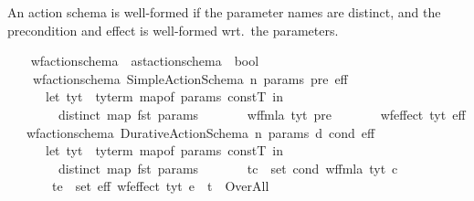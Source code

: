 \begin{isabellebody}
\begin{isamarkuptext}%
An action schema is well-formed if the parameter names are distinct,
    and the precondition and effect is well-formed wrt.\ the parameters.%
\end{isamarkuptext}\isamarkuptrue%
\ \ \isamarkupfalse%
\ wf{\isacharunderscore}{\kern0pt}action{\isacharunderscore}{\kern0pt}schema\ {\isacharcolon}{\kern0pt}{\isacharcolon}{\kern0pt}\ {\isachardoublequoteopen}ast{\isacharunderscore}{\kern0pt}action{\isacharunderscore}{\kern0pt}schema\ {\isasymRightarrow}\ bool{\isachardoublequoteclose}\ \isanewline
\ \ \ \ {\isachardoublequoteopen}wf{\isacharunderscore}{\kern0pt}action{\isacharunderscore}{\kern0pt}schema\ {\isacharparenleft}{\kern0pt}Simple{\isacharunderscore}{\kern0pt}Action{\isacharunderscore}{\kern0pt}Schema\ n\ params\ pre\ eff{\isacharparenright}{\kern0pt}\ {\isasymlongleftrightarrow}\ {\isacharparenleft}{\kern0pt}\isanewline
\ \ \ \ \ \ let\ tyt\ {\isacharequal}{\kern0pt}\ ty{\isacharunderscore}{\kern0pt}term\ {\isacharparenleft}{\kern0pt}map{\isacharunderscore}{\kern0pt}of\ params{\isacharparenright}{\kern0pt}\ constT\ in\isanewline
\ \ \ \ \ \ \ \ distinct\ {\isacharparenleft}{\kern0pt}map\ fst\ params{\isacharparenright}{\kern0pt}\isanewline
\ \ \ \ \ \ {\isasymand}\ wf{\isacharunderscore}{\kern0pt}fmla\ tyt\ pre\isanewline
\ \ \ \ \ \ {\isasymand}\ wf{\isacharunderscore}{\kern0pt}effect\ tyt\ eff{\isacharparenright}{\kern0pt}{\isachardoublequoteclose}\isanewline
\ \ {\isacharbar}{\kern0pt}\ {\isachardoublequoteopen}wf{\isacharunderscore}{\kern0pt}action{\isacharunderscore}{\kern0pt}schema\ {\isacharparenleft}{\kern0pt}Durative{\isacharunderscore}{\kern0pt}Action{\isacharunderscore}{\kern0pt}Schema\ n\ params\ d\ cond\ eff{\isacharparenright}{\kern0pt}\ {\isasymlongleftrightarrow}\ {\isacharparenleft}{\kern0pt}\isanewline
\ \ \ \ \ \ let\ tyt\ {\isacharequal}{\kern0pt}\ ty{\isacharunderscore}{\kern0pt}term\ {\isacharparenleft}{\kern0pt}map{\isacharunderscore}{\kern0pt}of\ params{\isacharparenright}{\kern0pt}\ constT\ in\isanewline
\ \ \ \ \ \ \ \ distinct\ {\isacharparenleft}{\kern0pt}map\ fst\ params{\isacharparenright}{\kern0pt}\isanewline
\ \ \ \ \ \ {\isasymand}\ {\isacharparenleft}{\kern0pt}{\isasymforall}{\isacharparenleft}{\kern0pt}t{\isacharcomma}{\kern0pt}c{\isacharparenright}{\kern0pt}\ {\isasymin}\ set\ cond{\isachardot}{\kern0pt}\ wf{\isacharunderscore}{\kern0pt}fmla\ tyt\ c{\isacharparenright}{\kern0pt}\isanewline
\ \ \ \ \ \ {\isasymand}\ {\isacharparenleft}{\kern0pt}{\isasymforall}{\isacharparenleft}{\kern0pt}t{\isacharcomma}{\kern0pt}e{\isacharparenright}{\kern0pt}\ {\isasymin}\ set\ eff{\isachardot}{\kern0pt}\ wf{\isacharunderscore}{\kern0pt}effect\ tyt\ e\ {\isasymand}\ t\ {\isasymnoteq}\ Over{\isacharunderscore}{\kern0pt}All{\isacharparenright}{\kern0pt}\isanewline

\end{isabellebody}
